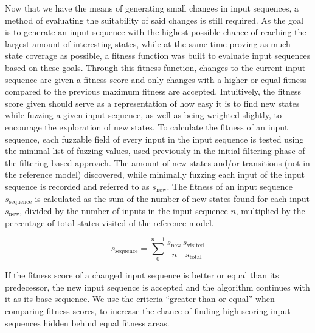 Now that we have the means of generating small changes in input sequences, a method of evaluating the suitability of said changes is still required. As the goal is to generate an input sequence with the highest possible chance of reaching the largest amount of interesting states, while at the same time proving as much state coverage as possible, a fitness function was built to evaluate input sequences based on these goals. Through this fitness function, changes to the current input sequence are given a fitness score and only changes with a higher or equal fitness compared to the previous maximum fitness are accepted. Intuitively, the fitness score given should serve as a representation of how easy it is to find new states while fuzzing a given input sequence, as well as being weighted slightly, to encourage the exploration of new states. To calculate the fitness of an input sequence, each fuzzable field of every input in the input sequence is tested using the minimal list of fuzzing values, used previously in the initial filtering phase of the filtering-based approach. The amount of new states and/or transitions (not in the reference model) discovered, while minimally fuzzing each input of the input sequence is recorded and referred to as $s_\mathrm{new}$. The fitness of an input sequence $s_\mathrm{sequence}$ is calculated as the sum of the number of new states found for each input $s_\mathrm{new}$, divided by the number of inputs in the input sequence $n$, multiplied by the percentage of total states visited of the reference model.

\begin{equation}s_\mathrm{sequence} = \sum_{0}^{n-1} \frac{s_\mathrm{new}}{n} \frac{s_\mathrm{visited}}{s_\mathrm{total}} \end{equation} \label{eq:scoring}

If the fitness score of a changed input sequence is better or equal than its predecessor, the new input sequence is accepted and the algorithm continues with it as its base sequence. We use the criteria ``greater than or equal'' when comparing fitness scores, to increase the chance of finding high-scoring input sequences hidden behind equal fitness areas. 

